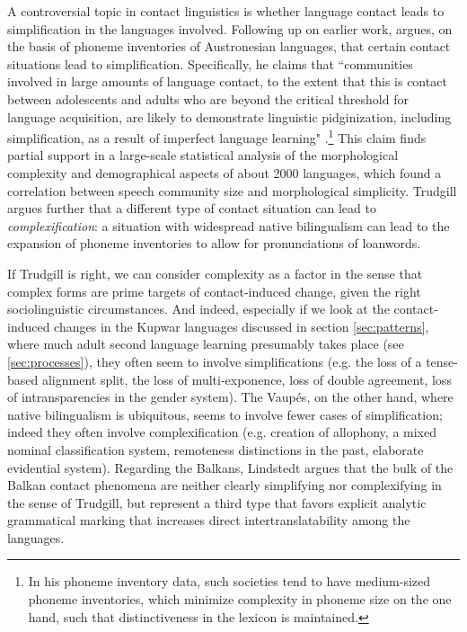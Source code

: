 \documentclass[output=paper,
modfonts
]{langscibook}
\begin{document}
\noindent A controversial topic in contact linguistics is whether language contact leads to simplification in the languages involved. 
Following up on earlier work, \textcite{trudgill2004linguistic} argues, on the basis of phoneme inventories of Austronesian languages, that certain contact situations lead to simplification. Specifically, he claims that ``communities involved in large amounts of language contact, to the extent that this is contact between adolescents and adults who are beyond the critical threshold for language acquisition, are likely to demonstrate linguistic pidginization, including simplification, as a result of imperfect language learning" \parencite[306]{trudgill2004linguistic}.\footnote{In his phoneme inventory data, such societies tend to have medium-sized phoneme inventories, which minimize complexity in phoneme size on the one hand, such that distinctiveness in the lexicon is maintained.} This claim finds partial support in a large-scale statistical analysis of the morphological complexity and demographical aspects \parencite{lupyanetal2010language} of about 2000 languages, which found a correlation between speech community size and morphological simplicity. Trudgill argues further that a different type of contact situation can lead to \textit{complexification}: a situation with widespread native bilingualism can lead to the expansion of phoneme inventories to allow for pronunciations of loanwords.

If Trudgill is right, we can consider complexity as a factor in the sense that complex forms are prime targets of contact-induced change, given the right sociolinguistic circumstances. And indeed, especially if we look at the contact-induced changes in the Kupwar languages discussed in section \ref{sec:patterns}, where much adult second language learning presumably takes place (see \ref{sec:processes}), they often seem to involve simplifications (e.g. the loss of a tense-based alignment split, the loss of multi-exponence, loss of double agreement, loss of intransparencies in the gender system). The Vaupés, on the other hand, where native bilingualism is ubiquitous, seems to involve fewer cases of simplification; indeed they often involve complexification (e.g. creation of allophony, a mixed nominal classification system, remoteness distinctions in the past, elaborate evidential system). Regarding the Balkans, Lindstedt \parencite*{lindstedt2018} argues that the bulk of the Balkan contact phenomena are neither clearly simplifying nor complexifying in the sense of Trudgill, but represent a third type that favors explicit analytic grammatical marking that increases direct intertranslatability among the languages.
\end{document}
